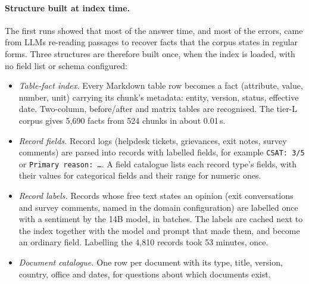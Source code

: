 \documentclass[11pt,letterpaper,oneside]{report}
\begin{document}
\paragraph{Structure built at index time.}
The first runs showed that most of the answer time, and most of the errors,
came from LLMs re-reading passages to recover facts that the corpus states in
regular forms. Three structures are therefore built once, when the index is
loaded, with no field list or schema configured:
\begin{itemize}
  \item \emph{Table-fact index.} Every Markdown table row becomes a fact
  (attribute, value, number, unit) carrying its chunk's metadata: entity,
  version, status, effective date. Two-column, before/after and matrix
  tables are recognised. The tier-L corpus gives 5{,}690 facts from 524
  chunks in about 0.01\,s.
  \item \emph{Record fields.} Record logs (helpdesk tickets, grievances, exit
  notes, survey comments) are parsed into records with labelled fields, for
  example \texttt{CSAT: 3/5} or \texttt{Primary reason: \ldots}. A field
  catalogue lists each record type's fields, with their values for
  categorical fields and their range for numeric ones.
  \item \emph{Record labels.} Records whose free text states an opinion (exit
  conversations and survey comments, named in the domain configuration) are
  labelled once with a sentiment by the 14B model, in batches. The labels
  are cached next to the index together with the model and prompt that made
  them, and become an ordinary field. Labelling the 4{,}810 records took 53
  minutes, once.
  \item \emph{Document catalogue.} One row per document with its type,
  title, version, country, office and dates, for questions about which
  documents exist.
\end{itemize}
\end{document}
